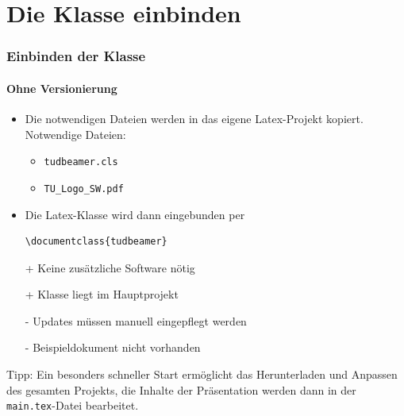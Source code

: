 \documentclass[german,notoc]{tudbeamer}%
\begin{document}
\section{Die Klasse einbinden}
\begin{frame}[fragile]
	\frametitle{Einbinden der Klasse}
	\framesubtitle{Ohne Versionierung}

	\begin{itemize}
		\item Die notwendigen Dateien werden in das eigene Latex-Projekt kopiert. Notwendige Dateien:
		\begin{itemize}
		 	\item \texttt{tudbeamer.cls}
		 	\item \texttt{TU\_Logo\_SW.pdf}
		\end{itemize}
		\item Die Latex-Klasse wird dann eingebunden per
			\begin{lstlisting}[gobble=8,style=latex,numbers=none]
				\documentclass{tudbeamer}
			\end{lstlisting}
	\end{itemize}
	\begin{itemize}
		\item[+] Keine zusätzliche Software nötig
		\item[+] Klasse liegt im Hauptprojekt
		\item[-] Updates müssen manuell eingepflegt werden
		\item[-] Beispieldokument nicht vorhanden
	\end{itemize}
	Tipp: Ein besonders schneller Start ermöglicht das Herunterladen und Anpassen des gesamten Projekts, die Inhalte der Präsentation werden dann in der \texttt{main.tex}-Datei bearbeitet.
\end{frame}
\end{document}
